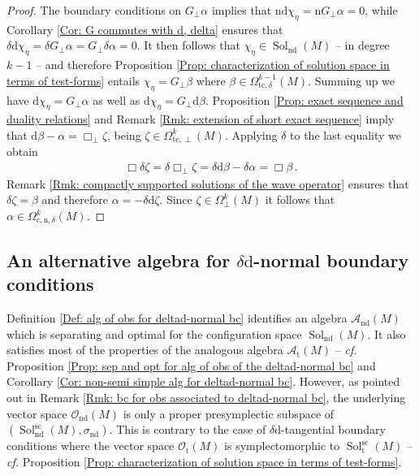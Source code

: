 \begin{proof}
	The boundary conditions on $G_\perp\alpha$ implies that $\mathrm{nd}\chi_\eta=\mathrm{n}G_\perp\alpha=0$, while Corollary \ref{Cor: G commutes with d, delta} ensures that $\delta\mathrm{d}\chi_\eta=\delta G_\perp\alpha=G_\perp\delta\alpha=0$.
	It then follows that $\chi_\eta\in\operatorname{Sol}_{\mathrm{nd}}(M)$ -- in degree $k-1$ -- and therefore Proposition \ref{Prop: characterization of solution space in terms of test-forms} entails $\chi_\eta=G_\perp\beta$ where $\beta\in\Omega_{\mathrm{tc},\delta}^{k-1}(M)$.
	Summing up we have $\mathrm{d}\chi_\eta=G_\perp\alpha$ as well as $\mathrm{d}\chi_\eta=G_\perp\mathrm{d}\beta$.
	Proposition \ref{Prop: exact sequence and duality relations} and Remark \ref{Rmk: extension of short exact sequence} imply that $\mathrm{d}\beta-\alpha=\Box_\perp\zeta$, being $\zeta\in\Omega_{\mathrm{tc},\perp}^k(M)$.
	Applying $\delta$ to the last equality we obtain
	\begin{align*}
	\Box\delta\zeta=
	\delta\Box_\perp\zeta=
	\delta\mathrm{d}\beta-\delta\alpha=
	\Box\beta\,.
	\end{align*}
	Remark \ref{Rmk: compactly supported solutions of the wave operator} ensures that $\delta\zeta=\beta$ and therefore $\alpha=-\delta\mathrm{d}\zeta$.
	Since $\zeta\in\Omega_{\perp}^k(M)$ it follows that $\alpha\in\Omega_{\mathrm{c,n},\delta}^k(M)$.
\end{proof}

\subsection{An alternative algebra for $\delta\mathrm{d}$-normal boundary conditions}\label{Sub: alternative algebra normal}

Definition \ref{Def: alg of obs for deltad-normal bc} identifies an algebra $\mathcal{A}_{\mathrm{nd}}(M)$ which is separating and optimal for the configuration space $\operatorname{Sol}_{\mathrm{nd}}(M)$.
It also satisfies most of the properties of the analogous algebra $\mathcal{A}_{\mathrm{t}}(M)$ -- \textit{cf.} Proposition \ref{Prop: sep and opt for alg of obs of the deltad-normal bc} and Corollary \ref{Cor: non-semi simple alg for deltad-normal bc}.
However, as pointed out in Remark \ref{Rmk: bc for obs associated to deltad-normal bc}, the underlying vector space $\mathcal{O}_{\mathrm{nd}}(M)$ is only a proper presymplectic subspace of $(\operatorname{Sol}_{\mathrm{nd}}^{\mathrm{sc}}(M),\sigma_{\mathrm{nd}})$.
This is contrary to the case of $\delta\mathrm{d}$-tangential boundary conditions where the vector space $\mathcal{O}_{\mathrm{t}}(M)$ is symplectomorphic to $\operatorname{Sol}_{\mathrm{t}}^{\mathrm{sc}}(M)$ -- \textit{cf.} Proposition \ref{Prop: characterization of solution space in terms of test-forms}.

